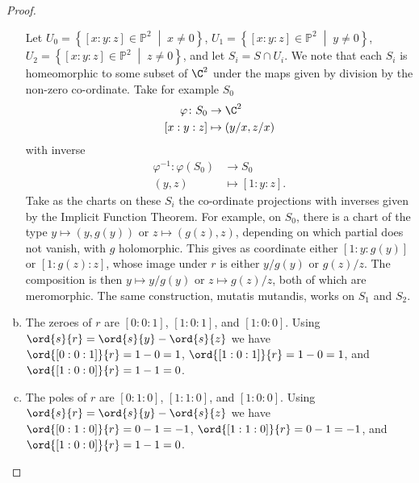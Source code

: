 \documentclass[10pt]{amsart}
\begin{document}
\begin{thm}
\begin{proof}
\begin{enumerate}[(a)]
      Let $U_0 = \left\{ [x : y : z] \in \mathbb{P}^2 \;\middle\vert\; x \neq 0 \right\}$, 
      $U_1 = \left\{ [x : y : z] \in \mathbb{P}^2 \;\middle\vert\; y \neq 0 \right\}$, 
      $U_2 = \left\{ [x : y : z] \in \mathbb{P}^2 \;\middle\vert\; z \neq 0\right\}$, and
      let $S_i = S \cap U_i$.
      We note that each $S_i$ is homeomorphic to some subset of $\C^2$ under the maps given by division by the non-zero co-ordinate.  
      Take for example $S_0$
      \begin{align*}
        \varphi \colon S_0 &\rightarrow \C^2\\
        [x : y : z] &\mapsto (y/x, z/x) 
      \end{align*}
      with inverse
      \begin{align*}
        \varphi^{-1} \colon \varphi(S_0) &\rightarrow S_0\\
        (y,z) &\mapsto [1 : y : z].
      \end{align*}
      Take as the charts on these $S_i$ the co-ordinate projections with inverses given by the Implicit Function Theorem.
      For example, on $S_0$, there is a chart of the type $y \mapsto (y, g(y))$ or $z \mapsto (g(z), z)$, depending on which partial does not vanish, with $g$ holomorphic.
      This gives as coordinate either $[1 : y : g(y)]$ or $[1 : g(z) : z]$, whose image under $r$ is either $y/g(y)$ or $g(z)/z$.
      The composition is then $y \mapsto y/g(y)$ or $z \mapsto g(z)/z$, both of which are meromorphic.
      The same construction, mutatis mutandis, works on $S_1$ and $S_2$.
    \item
      The zeroes of $r$ are $[0 : 0 : 1]$, $[1 : 0 : 1]$, and $[1 : 0 : 0]$.
      Using $\ord{s}{r} = \ord{s}{y} - \ord{s}{z}$ we have
      $\ord{[0 : 0 : 1]}{r} = 1 - 0 = 1$,
      $\ord{[1 : 0 : 1]}{r} = 1 - 0 = 1$, and
      $\ord{[1 : 0 : 0]}{r} = 1 - 1 = 0$.
    \item
      The poles of $r$ are $[0 : 1 : 0]$, $[1 : 1 : 0]$, and $[1 : 0 : 0]$.
      Using $\ord{s}{r} = \ord{s}{y} - \ord{s}{z}$ we have
      $\ord{[0 : 1 : 0]}{r} = 0 - 1 = -1$,
      $\ord{[1 : 1 : 0]}{r} = 0 - 1 = -1$, and
      $\ord{[1 : 0 : 0]}{r} = 1 - 1 = 0$.
    \end{enumerate}
  \end{proof}
\end{thm}
\end{document}
